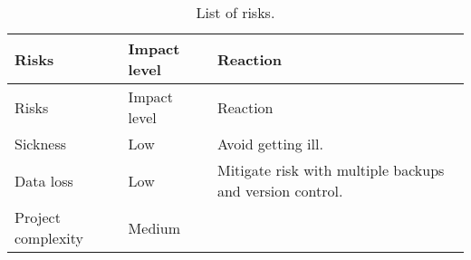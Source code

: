 \begin{longtable}[]{@{}lll@{}}
\caption{List of risks.}\tabularnewline
\toprule
\begin{minipage}[b]{0.28\columnwidth}\raggedright\strut
Risks\strut
\end{minipage} & \begin{minipage}[b]{0.13\columnwidth}\raggedright\strut
Impact level\strut
\end{minipage} & \begin{minipage}[b]{0.50\columnwidth}\raggedright\strut
Reaction\strut
\end{minipage}\tabularnewline
\midrule
\endfirsthead
\toprule
\begin{minipage}[b]{0.28\columnwidth}\raggedright\strut
Risks\strut
\end{minipage} & \begin{minipage}[b]{0.13\columnwidth}\raggedright\strut
Impact level\strut
\end{minipage} & \begin{minipage}[b]{0.50\columnwidth}\raggedright\strut
Reaction\strut
\end{minipage}\tabularnewline
\midrule
\endhead
\begin{minipage}[t]{0.28\columnwidth}\raggedright\strut
Sickness\strut
\end{minipage} & \begin{minipage}[t]{0.13\columnwidth}\raggedright\strut
Low\strut
\end{minipage} & \begin{minipage}[t]{0.50\columnwidth}\raggedright\strut
Avoid getting ill.\strut
\end{minipage}\tabularnewline
\begin{minipage}[t]{0.28\columnwidth}\raggedright\strut
Data loss\strut
\end{minipage} & \begin{minipage}[t]{0.13\columnwidth}\raggedright\strut
Low\strut
\end{minipage} & \begin{minipage}[t]{0.50\columnwidth}\raggedright\strut
Mitigate risk with multiple backups and version control.\strut
\end{minipage}\tabularnewline
\begin{minipage}[t]{0.28\columnwidth}\raggedright\strut
Project complexity\strut
\end{minipage} & \begin{minipage}[t]{0.13\columnwidth}\raggedright\strut
Medium\strut
\end{minipage} & \begin{minipage}[t]{0.50\columnwidth}\raggedright\strut

\end{minipage}
\end{longtable}
